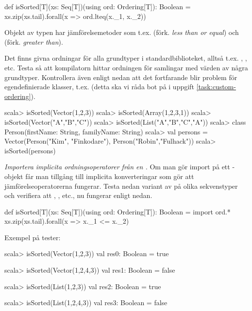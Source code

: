 \begin{CodeSmall}
def isSorted[T](xs: Seq[T])(using ord: Ordering[T]): Boolean =
  xs.zip(xs.tail).forall(x => ord.lteq(x._1, x._2))
\end{CodeSmall}

Objekt av typen  har jämförelsemetoder som t.ex.  (förk. \emph{less than or equal}) och  (förk. \emph{greater than}).

Det finns givna ordningar för alla grundtyper i standardbiblioteket, alltså t.ex. , , etc.
Testa så att kompilatorn hittar ordningen för samlingar med värden av några grundtyper. Kontrollera även enligt nedan att det fortfarande blir problem för egendefinierade klasser, t.ex.   (detta ska vi råda bot på i uppgift \ref{task:custom-ordering}).
\begin{REPL}
scala> isSorted(Vector(1,2,3))
scala> isSorted(Array(1,2,3,1))
scala> isSorted(Vector("A","B","C"))
scala> isSorted(List("A","B","C","A"))
scala> class Person(firstName: String, familyName: String)
scala> val persons = Vector(Person("Kim", "Finkodare"), Person("Robin","Fulhack"))
scala> isSorted(persons)
\end{REPL}

\Subtask \emph{Importera implicita ordningsoperatorer från en .} Om man gör import på ett -objekt får man tillgång till implicita konverteringar som gör att jämförelseoperatorerna fungerar. Testa nedan variant av  på olika sekvenstyper och verifiera att \code{<=}, \code{>}, etc., nu fungerar enligt nedan.
\begin{CodeSmall}
def isSorted[T](xs: Seq[T])(using ord: Ordering[T]): Boolean =
  import ord.*
  xs.zip(xs.tail).forall(x => x._1 <= x._2)
\end{CodeSmall}


\SOLUTION

\TaskSolved \what

\SubtaskSolved 
Exempel på tester:
\begin{REPLnonum}
scala> isSorted(Vector(1,2,3))
val res0: Boolean = true

scala> isSorted(Vector(1,2,4,3))
val res1: Boolean = false

scala> isSorted(List(1,2,3))
val res2: Boolean = true

scala> isSorted(List(1,2,4,3))
val res3: Boolean = false
\end{REPLnonum}

